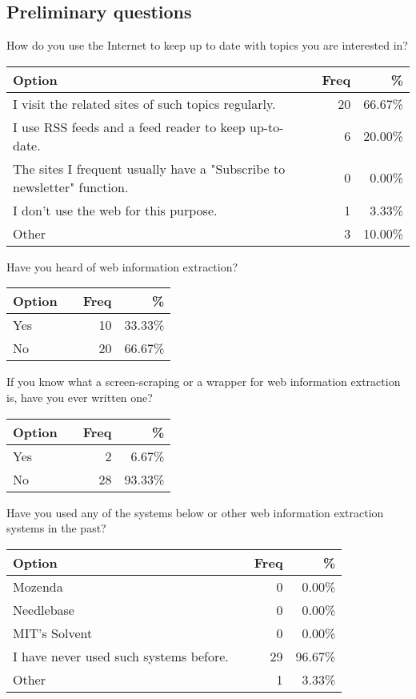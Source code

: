 \subsection{Preliminary questions}
\begin{center}
\singlespacing
\small
How do you use the Internet to keep up to date with topics you are interested in?\\
\begin{tabular}{|l|c|r|r|}
\hline
Option	& & Freq & \% \\
\hline
\hline
I visit the related sites of such topics regularly.	&	&20	&66.67\%\\
I use RSS feeds and a feed reader to keep up-to-date.	&	&6	&20.00\%\\
The sites I frequent usually have a "Subscribe to newsletter" function.	&	&0	&0.00\%\\
I don't use the web for this purpose.	&	&1	&3.33\%\\
Other	&	&3	&10.00\%\\
\hline
\end{tabular}

Have you heard of web information extraction?\\
\begin{tabular}{|l|c|r|r|}
\hline
Option	& & Freq & \% \\
\hline
\hline
Yes	&	&10	&33.33\%\\
No	&	&20	&66.67\%\\
\hline
\end{tabular}

If you know what a screen-scraping or a wrapper for web information extraction is, have you ever written one?\\
\begin{tabular}{|l|c|r|r|}
\hline
Option	& & Freq & \% \\
\hline
\hline
Yes	&	&2	&6.67\%\\
No	&	&28	&93.33\%\\
\hline
\end{tabular}


Have you used any of the systems below or other web information extraction systems in the past?\\
\begin{tabular}{|l|c|r|r|}
\hline
Option	& & Freq & \% \\
\hline
\hline
Mozenda	&	&0	&0.00\%\\
Needlebase	&	&0	&0.00\%\\
MIT's Solvent	&	&0	&0.00\%\\
I have never used such systems before.	&	&29	&96.67\%\\
Other	&	&1	&3.33\%\\
\hline
\end{tabular}
\end{center}
